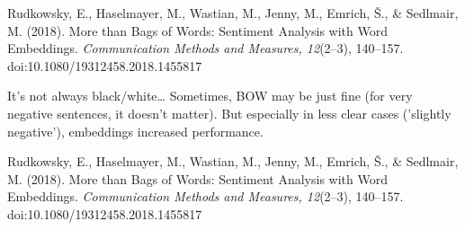 \documentclass[compress]{beamer}
\begin{document}
\begin{frame}[plain]
	
	\tiny{Rudkowsky, E., Haselmayer, M., Wastian, M., Jenny, M., Emrich, Š., \& Sedlmair, M. (2018). More than Bags of Words: Sentiment Analysis with Word Embeddings. \textit{Communication Methods and Measures, 12}(2–3), 140–157. doi:10.1080/19312458.2018.1455817}
\end{frame}


\begin{frame}{It's not always black/white\ldots}
	Sometimes, BOW may be just fine (for very negative sentences, it doesn't matter). But especially in less clear cases ('slightly negative'), embeddings increased performance.
	
	\vfill
	
	\tiny{Rudkowsky, E., Haselmayer, M., Wastian, M., Jenny, M., Emrich, Š., \& Sedlmair, M. (2018). More than Bags of Words: Sentiment Analysis with Word Embeddings. \textit{Communication Methods and Measures, 12}(2–3), 140–157. doi:10.1080/19312458.2018.1455817}
\end{frame}
\end{document}
